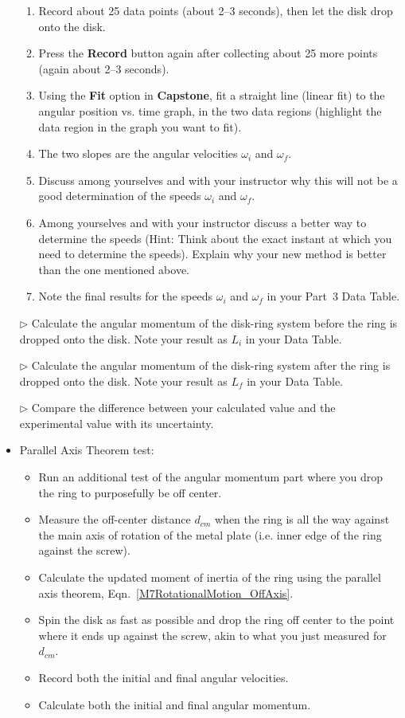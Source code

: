 \begin{itemize}
\begin{enumerate}
  \item Record about 25 data points (about 2--3 seconds), then let the disk drop onto the disk.
  \item Press the \textbf{Record} button again after collecting about 25 more points (again about 2--3 seconds).
  \item Using the \textbf{Fit} option in \textbf{Capstone}, fit a straight line (linear fit) to the angular position vs. time graph, in the two data regions (highlight the data region in the graph you want to fit).
  \item The two slopes are the angular velocities $\omega_i$ and $\omega_f$.
  \item Discuss among yourselves and with your instructor why this will not be a good determination of the speeds $\omega_i$ and $\omega_f$.
  \item Among yourselves and with your instructor discuss a better way to determine the speeds (Hint: Think about the exact instant at which you need to determine the speeds). Explain why your new method is better than the one mentioned above.
  \item Note the final results for the speeds $\omega_i$ and $\omega_f$ in your Part~3 Data Table.
  \end{enumerate}
\item[$\triangleright$] Calculate the angular momentum of the disk-ring system before the ring is dropped onto the disk. Note your result as $L_i$ in your Data Table.
\item[$\triangleright$] Calculate the angular momentum of the disk-ring system after the ring is dropped onto the disk. Note your result as $L_f$ in your Data Table.
\item[$\triangleright$] Compare the difference between your calculated value and the experimental value with its uncertainty.

\item Parallel Axis Theorem test:
\begin{itemize}
    \item Run an additional test of the angular momentum part where you drop the ring to purposefully be off center.
    \item Measure the off-center distance ${d_{cm}}$ when the ring is all the way against the main axis of rotation of the metal plate (i.e. inner edge of the ring against the screw).
    \item Calculate the updated moment of inertia of the ring using the parallel axis theorem, Eqn.~\ref{M7RotationalMotion_OffAxis}.
    \item Spin the disk as fast as possible and drop the ring off center to the point where it ends up against the screw, akin to what you just measured for ${d_{cm}}$.
    \item Record both the initial and final angular velocities.
    \item Calculate both the initial and final angular momentum.
\end{itemize}

\end{itemize}



